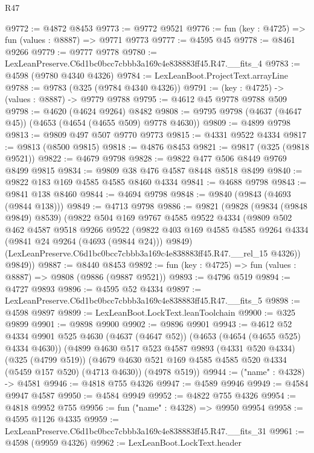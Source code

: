 \begin{lexlean}{R47}
\begin{coremodule}
@9772 := @4872 @8453
@9773 := @9772 @9521
@9776 := fun (key : @4725) => fun (values : @8887) => @9771 @9773
@9777 := @4595 @45
@9778 := @8461 @9266
@9779 := @9777 @9778
@9780 := LexLeanPreserve.C6d1bc0bcc7cbbb3a169c4e838883ff45.R47.__fits_4
@9783 := @4598 (@9780 @4340 @4326)
@9784 := LexLeanBoot.ProjectText.arrayLine
@9788 := @9783 (@325 (@9784 @4340 @4326))
@9791 := (key : @4725) -> (values : @8887) -> @9779 @9788
@9795 := @4612 @45 @9778 @9788 @509
@9798 := @4620 (@4624 @9264) @8482
@9808 := @9795 @9798 (@4637 (@4647 @45)) (@4653 (@4654 (@4655 @509) @9778 @4630))
@9809 := @4899 @9798
@9813 := @9809 @497 @507 @9770 @9773
@9815 := @4331 @9522 @4334
@9817 := @9813 (@8500 @9815)
@9818 := @4876 @8453
@9821 := @9817 (@325 (@9818 @9521))
@9822 := @4679 @9798
@9828 := @9822 @477 @506 @8449 @9769 @8499 @9815
@9834 := @9809 @38 @476 @4587 @8448 @8518 @8499
@9840 := @9822 @183 @169 @4585 @4585 @8460 @4334
@9841 := @4688 @9798
@9843 := @9841 @138 @8460
@9844 := @4694 @9798
@9848 := @9840 (@9843 (@4693 (@9844 @138)))
@9849 := @4713 @9798
@9886 := @9821
    (@9828
      (@9834 (@9848 @9849) @8539)
      (@9822
        @504
        @169
        @9767
        @4585
        @9522
        @4334
        (@9809
          @502
          @462
          @4587
          @9518
          @9266
          @9522
          (@9822 @403 @169 @4585 @4585 @9264 @4334 (@9841 @24 @9264 (@4693 (@9844 @24))) @9849)
          (LexLeanPreserve.C6d1bc0bcc7cbbb3a169c4e838883ff45.R47.__rel_15 @4326))
        @9849))
@9887 := @8440 @8453
@9892 := fun (key : @4725) => fun (values : @8887) => @9808 (@9886 (@9887 @9521))
@9893 := @4796 @519
@9894 := @4727 @9893
@9896 := @4595 @52 @4334
@9897 := LexLeanPreserve.C6d1bc0bcc7cbbb3a169c4e838883ff45.R47.__fits_5
@9898 := @4598 @9897
@9899 := LexLeanBoot.LockText.leanToolchain
@9900 := @325 @9899
@9901 := @9898 @9900
@9902 := @9896 @9901
@9943 := @4612
    @52
    @4334
    @9901
    @525
    @4630
    (@4637 (@4647 @52))
    (@4653 (@4654 (@4655 @525) @4334 @4630))
    (@4899
      @4630
      @517
      @523
      @4587
      @9893
      (@4331 @520 @4334)
      (@325 (@4799 @519))
      (@4679 @4630 @521 @169 @4585 @4585 @520 @4334 (@5459 @157 @520) (@4713 @4630))
      (@4978 @519))
@9944 := ("name" : @4328) -> @4581
@9946 := @4818 @755 @4326
@9947 := @4589 @9946
@9949 := @4584 @9947 @4587
@9950 := @4584 @9949
@9952 := @4822 @755 @4326
@9954 := @4818 @9952 @755
@9956 := fun ("name" : @4328) => @9950 @9954
@9958 := @4595 @1126 @4335
@9959 := LexLeanPreserve.C6d1bc0bcc7cbbb3a169c4e838883ff45.R47.__fits_31
@9961 := @4598 (@9959 @4326)
@9962 := LexLeanBoot.LockText.header

\end{coremodule}
\end{lexlean}
